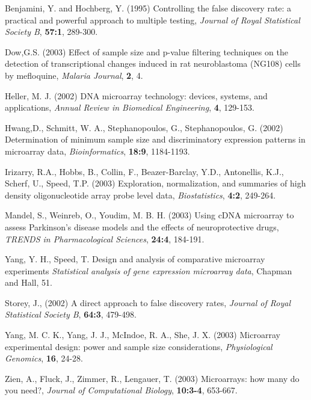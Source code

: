 \documentclass[12pt]{article}
\begin{document}

\begin{thebibliography}{}

 Benjamini, Y.
  and Hochberg, Y. (1995) Controlling the false discovery rate: a
  practical and powerful approach to multiple testing, {\it Journal
  of Royal Statistical Society B}, {\bf 57:1}, 289-300.

 Dow,G.S. (2003) Effect of sample size
  and p-value filtering techniques on the detection of
  transcriptional changes induced in rat neuroblastoma (NG108) cells
  by mefloquine, {\it Malaria Journal}, {\bf 2}, 4.

 Heller, M. J. (2002) {DNA
  microarray technology: devices, systems, and applications}, {\it
  Annual Review in Biomedical Engineering}, {\bf 4}, 129-153.

 Hwang,D., Schmitt,
  W. A., Stephanopoulos, G., Stephanopoulos, G. (2002) Determination
  of minimum sample size and discriminatory expression patterns in
  microarray data, {\it Bioinformatics}, {\bf 18:9}, 1184-1193.

 Irizarry, R.A.,
  Hobbs, B., Collin, F., Beazer-Barclay, Y.D., Antonellis, K.J.,
  Scherf, U., Speed, T.P. (2003) Exploration, normalization, and
  summaries of high density oligonucleotide array probe level data,
  {\it Biostatistics}, {\bf 4:2}, 249-264.

 Mandel, S.,  Weinreb,
  O., Youdim, M. B. H. (2003) Using cDNA microarray to assess
  Parkinson's disease models and the effects of neuroprotective
  drugs, {\it TRENDS in Pharmacological Sciences}, {\bf 24:4},
  184-191.

 Yang, Y. H., Speed, T.
  {Design and analysis of comparative microarray experiments \it
  Statistical analysis of gene expression microarray data}, {Chapman
  and Hall}, 51.

 Storey, J., (2002)
  A direct approach to false discovery rates, {\it Journal of Royal
  Statistical Society B}, {\bf 64:3}, 479-498.

 Yang, M. C. K., Yang,
  J. J., McIndoe, R. A., She, J. X. (2003) Microarray experimental
  design: power and sample size considerations, {\it Physiological
  Genomics}, {\bf 16}, 24-28.

 Zien, A., Fluck, J.,
  Zimmer, R., Lengauer, T. (2003) Microarrays: how many do you
  need?, {\it Journal of Computational Biology}, {\bf 10:3-4},
  653-667.

\end{thebibliography}
\end{document}
